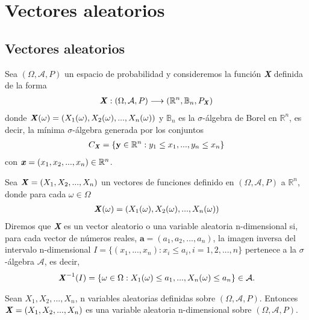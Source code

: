 \chapter{Vectores aleatorios}

\section{Vectores aleatorios}

Sea $(\Omega, \mathcal{A}, P)$ un espacio de probabilidad y consideremos la función \textbf{\textit{X}} definida de la forma
\begin{align*}
    \textbf{\textit{X}} : (\Omega, \mathcal{A}, P) \longrightarrow (\mathbb{R}^n, \mathbb{B}_n, P_{\textbf{\textit{X}}})
\end{align*}
donde $\textbf{\textit{X}}(\omega) = (X_1(\omega), X_2(\omega),..., X_n(\omega))$ y $\mathbb{B}_n$ es la $\sigma$-álgebra de Borel en $\mathbb{R}^n$, es decir, la mínima $\sigma$-álgebra generada por los conjuntos
\begin{align*}
    C_{\textbf{\textit{X}}} = \{ \textbf{y} \in \mathbb{R}^n : y_1 \leq x_1, ..., y_n \leq x_n\}
\end{align*}
con $\textbf{\textit{x}} = (x_1,x_2,...,x_n) \in \mathbb{R}^n$.

\begin{defi}
Sea $\textbf{\textit{X}} = (X_1, X_2,..., X_n)$ un vectores de funciones definido en $(\Omega, \mathcal{A}, P)$ a $\mathbb{R}^n$, donde para cada $\omega \in \Omega$
\begin{align*}
    \textbf{\textit{X}}(\omega) = (X_1(\omega), X_2(\omega),..., X_n(\omega))
\end{align*}
Diremos que \textbf{\textit{X}} es un vector aleatorio o una variable aleatoria n-dimensional si, para cada vector de números reales, $\textbf{a} = (a_1,a_2,...,a_n)$, la imagen inversa del intervalo n-dimensional $I = \{ (x_1,...,x_n) : x_i \leq a_i, i = 1,2,...,n \}$ pertenece a la $\sigma$-álgebra $\mathcal{A}$, es decir,
\begin{align*}
    \textbf{\textit{X}}^{-1}(I) = \{ \omega \in \Omega : X_1(\omega) \leq a_1, ..., X_n(\omega) \leq a_n \} \in \mathcal{A}.
\end{align*}
\end{defi}

\begin{teo}
Sean $X_1,X_2,...,X_n$, n variables  aleatorias definidas sobre $(\Omega, \mathcal{A}, P)$. Entonces  $\textbf{\textit{X}} = (X_1, X_2,..., X_n)$ es una variable aleatoria n-dimensional sobre $(\Omega, \mathcal{A}, P)$.
\end{teo}


